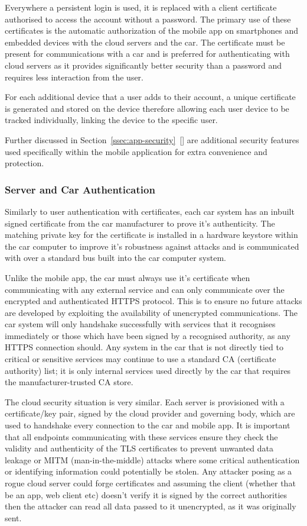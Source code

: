\documentclass{article}
\begin{document}
Everywhere a persistent login is used, it is replaced with a client certificate authorised to access the account without a password. The primary use of these certificates is the automatic authorization of the mobile app on smartphones and embedded devices with the cloud servers and the car. The certificate must be present for communications with a car and is preferred for authenticating with cloud servers as it provides significantly better security than a password and requires less interaction from the user.

For each additional device that a user adds to their account, a unique certificate is generated and stored on the device therefore allowing each user device to be tracked individually, linking the device to the specific user.

Further discussed in Section~\ref{ssec:app-security}~[] are additional security features used specifically within the mobile application for extra convenience and protection.

\subsubsection{Server and Car Authentication}
Similarly to user authentication with certificates, each car system has an inbuilt signed certificate from the car manufacturer to prove it's authenticity. The matching private key for the certificate is installed in a hardware keystore within the car computer to improve it's robustness against attacks and is communicated with over a standard bus built into the car computer system.

Unlike the mobile app, the car must always use it's certificate when communicating with any external service and can only communicate over the encrypted and authenticated HTTPS protocol. This is to ensure no future attacks are developed by exploiting the availability of unencrypted communications.
The car system will only handshake successfully with services that it recognises immediately or those which have been signed by a recognised authority, as any HTTPS connection should.
Any system in the car that is not directly tied to critical or sensitive services may continue to use a standard CA (certificate authority) list; it is only internal services used directly by the car that requires the manufacturer-trusted CA store.

The cloud security situation is very similar. Each server is provisioned with a certificate/key pair, signed by the cloud provider and governing body, which are used to handshake every connection to the car and mobile app.
It is important that all endpoints communicating with these services ensure they check the validity and authenticity of the TLS certificates to prevent unwanted data leakage or MITM (man-in-the-middle) attacks where some critical authentication or identifying information could potentially be stolen. Any attacker posing as a rogue cloud server could forge certificates and assuming the client (whether that be an app, web client etc) doesn't verify it is signed by the correct authorities then the attacker can read all data passed to it unencrypted, as it was originally sent.
\end{document}

